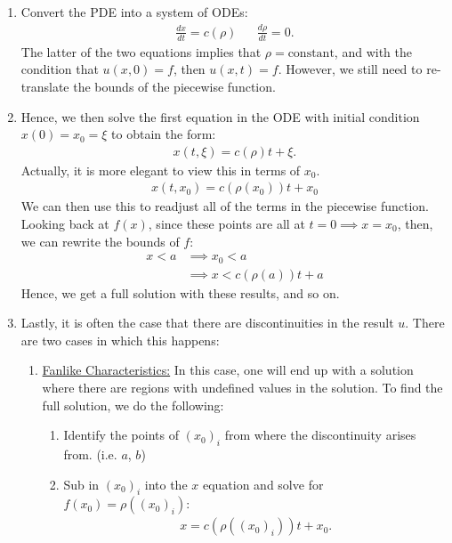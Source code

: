 \documentclass{article}
\newcommand{\sheader}[1]{\underline{#1:}}
\begin{document}
\begin{enumerate}
    \item Convert the PDE into a system of ODEs:
    \begin{align*}
        \frac{dx}{dt} = c(\rho) && \frac{d\rho}{dt} = 0.
    \end{align*}
    The latter of the two equations implies that $\rho = \textrm{constant}$,
    and with the condition that $u(x, 0) = f$, then $u(x, t) = f$. However, 
    we still need to re-translate the bounds of the piecewise function.
    \item Hence, we then solve the first equation in the ODE with initial condition
    $x(0) = x_0 = \xi$ to obtain the form:
    \begin{align*}
        x(t, \xi) = c(\rho)t + \xi.
    \end{align*}
    Actually, it is more elegant to view this in terms of $x_0$.
    \begin{align*}
        x(t, x_0) = c(\rho(x_0))t + x_0
    \end{align*}
    We can then use this to readjust all of the terms in the piecewise function. 
    Looking back at $f(x)$, since these points are all at $t = 0 \implies x = x_0$,
    then, we can rewrite the bounds of $f$:
    \begin{align*}
        x<a &\implies x_0 < a\\
        &\implies x < c(\rho(a))t + a
    \end{align*}
    Hence, we get a full solution with these results, and so on.
    \item Lastly, it is often the case that there are discontinuities in the result 
    $u$. There are two cases in which this happens:
    \begin{enumerate}
        \item \sheader{Fanlike Characteristics} In this case,
        one will end up with a solution where there are regions with undefined 
        values in the solution. To find the full solution, we do the following:
        \begin{enumerate}
            \item Identify the points of $(x_0)_i$ from where the discontinuity
            arises from. (i.e. $a$, $b$)
            \item Sub in $(x_0)_i$ into the $x$ equation and solve for $f(x_0) = \rho((x_0)_i)$:
            \begin{align*}
                x = c(\rho((x_0)_i))t + x_0.
            \end{align*}

\end{enumerate}
\end{enumerate}
\end{enumerate}
\end{document}
